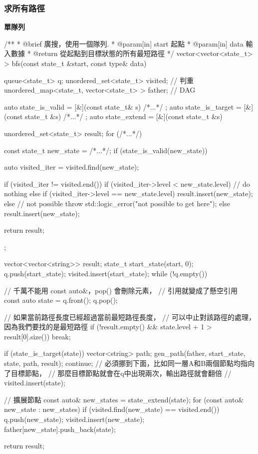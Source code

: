 \subsubsection{求所有路徑}

\textbf{單隊列}

\begin{Codex}[label=bfs_template.cpp]
/**
 * @brief 廣搜，使用一個隊列.
 * @param[in] start 起點
 * @param[in] data 輸入數據
 * @return 從起點到目標狀態的所有最短路徑
 */
vector<vector<state_t> > bfs(const state_t &start, const type& data) {
    queue<state_t> q;
    unordered_set<state_t> visited; // 判重
    unordered_map<state_t, vector<state_t> > father; // DAG

    auto state_is_valid = [&](const state_t& s) { /*...*/ };
    auto state_is_target = [&](const state_t &s) { /*...*/ };
    auto state_extend = [&](const state_t &s) {
        unordered_set<state_t> result;
        for (/*...*/) {
            const state_t new_state = /*...*/;
            if (state_is_valid(new_state)) {
                auto visited_iter = visited.find(new_state);

                if (visited_iter != visited.end()) {
                    if (visited_iter->level < new_state.level) {
                        // do nothing
                    } else if (visited_iter->level == new_state.level) {
                        result.insert(new_state);
                    } else { // not possible
                        throw std::logic_error("not possible to get here");
                    }
                } else {
                    result.insert(new_state);
                }
            }
        }

        return result;
    };

    vector<vector<string>> result;
    state_t start_state(start, 0);
    q.push(start_state);
    visited.insert(start_state);
    while (!q.empty()) {
        // 千萬不能用 const auto&，pop() 會刪除元素，
        // 引用就變成了懸空引用
        const auto state = q.front();
        q.pop();

        // 如果當前路徑長度已經超過當前最短路徑長度，
        // 可以中止對該路徑的處理，因為我們要找的是最短路徑
        if (!result.empty() && state.level + 1 > result[0].size()) break;

        if (state_is_target(state)) {
            vector<string> path;
            gen_path(father, start_state, state, path, result);
            continue;
        }
        // 必須挪到下面，比如同一層A和B兩個節點均指向了目標節點，
        // 那麼目標節點就會在q中出現兩次，輸出路徑就會翻倍
        // visited.insert(state);

        // 擴展節點
        const auto& new_states = state_extend(state);
        for (const auto& new_state : new_states) {
            if (visited.find(new_state) == visited.end()) {
                q.push(new_state);
            }
            visited.insert(new_state);
            father[new_state].push_back(state);
        }
    }

    return result;
}
\end{Codex}


